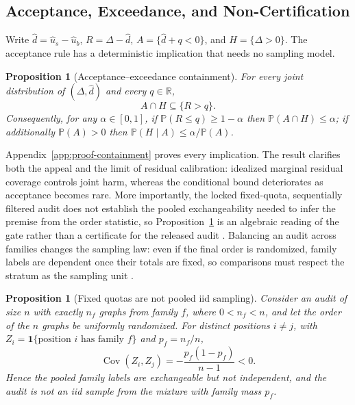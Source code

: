 \documentclass[aps,prx,reprint,superscriptaddress,floatfix]{revtex4-2}
\newtheorem{proposition}[theorem]{Proposition}
\newcommand{\Pp}{\mathbb{P}}
\newcommand{\R}{\mathbb{R}}
\begin{document}
\subsection{Acceptance, Exceedance, and Non-Certification}

Write $\widehat d=\widehat u_s-\widehat u_b$, $R=\Delta-\widehat d$,
$A=\{\widehat d+q<0\}$, and $H=\{\Delta>0\}$.  The acceptance rule has a
deterministic implication that needs no sampling model.

\begin{proposition}[Acceptance--exceedance containment]
\label{prop:containment}
For every joint distribution of $(\Delta,\widehat d)$ and every $q\in\R$,
\begin{equation}
 A\cap H\subseteq\{R>q\}.
 \label{eq:containment}
\end{equation}
Consequently, for any $\alpha\in[0,1]$, if $\Pp(R\le q)\ge1-\alpha$ then
$\Pp(A\cap H)\le\alpha$; if additionally $\Pp(A)>0$ then
$\Pp(H\mid A)\le\alpha/\Pp(A)$.
\end{proposition}

Appendix~\ref{app:proof-containment} proves every implication.  The result
clarifies both the appeal and the limit of residual calibration: idealized
marginal residual coverage controls joint harm, whereas the conditional bound
deteriorates as acceptance becomes rare.  More importantly, the locked
fixed-quota, sequentially filtered audit does not establish the pooled
exchangeability needed to infer the premise from the order statistic, so
Proposition~\ref{prop:containment} is an algebraic reading of the gate rather
than a certificate for the released audit \citep{barber2022exchangeability}.
Balancing an audit across families changes the sampling law: even if the final
order is randomized, family labels are dependent once their totals are fixed, so
comparisons must respect the stratum as the sampling unit
\citep{demsar2006statistical,efron1993bootstrap}.

\begin{proposition}[Fixed quotas are not pooled iid sampling]
\label{prop:quota}
Consider an audit of size $n$ with exactly $n_f$ graphs from family $f$, where
$0<n_f<n$, and let the order of the $n$ graphs be uniformly randomized.  For
distinct positions $i\ne j$, with
$Z_i=\mathbf 1\{\text{position }i\text{ has family }f\}$ and $p_f=n_f/n$,
\begin{equation}
 \operatorname{Cov}(Z_i,Z_j)=-\frac{p_f(1-p_f)}{n-1}<0.
 \label{eq:quota-covariance}
\end{equation}
Hence the pooled family labels are exchangeable but not independent, and the
audit is not an iid sample from the mixture with family mass $p_f$.
\end{proposition}
\end{document}

